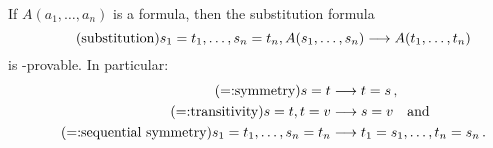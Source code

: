 \documentclass[11pt,a4paper]{article}
\begin{document}
\begin{proposition}[7.2]\label{prop:7.2}
    If \(A(a_1,\ldots,a_n)\) is a formula,
    then the substitution formula
    \begin{equation}\tag{substitution}\label{eq:substitution}
        s_1 = t_1,\ldots,s_n=t_n,A(s_1,\ldots,s_n)\longrightarrow A(t_1,\ldots,t_n)
    \end{equation}
    is \LK-provable. In particular:
    \begin{align}
        \tag{=:symmetry}\label{eq:symmetry}
            s=t&\longrightarrow t=s\,,\\
        \tag{=:transitivity}\label{eq:transitivity}
            s=t,t=v&\longrightarrow s=v\quad\text{and} \\
        \tag{=:sequential symmetry}\label{eq:sequential symmetry}
            s_1 = t_1,\ldots,s_n = t_n&\longrightarrow t_1 = s_1, \ldots, t_n = s_n\,.
    \end{align}
\end{proposition}
\end{document}
